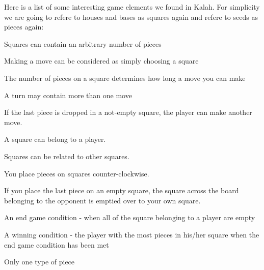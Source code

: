 Here is a list of some interesting game elements we found in Kalah. For simplicity we are going to refere to houses and bases as squares again and refere to seeds as pieces again:

\begin{dlist}
	\item Squares can contain an arbitrary number of pieces
	\item Making a move can be considered as simply choosing a square
	\item The number of pieces on a square determines how long a move you can make
	\item A turn may contain more than one move
		\begin{dlist}
			\item If the last piece is dropped in a not-empty square, the player can make another move.
		\end{dlist}
	\item A square can belong to a player.
	\item Squares can be related to other squares.
		\begin{dlist}
			\item You place pieces on squares counter-clockwise.
			\item If you place the last piece on an empty square, the square across the board belonging to the opponent is emptied over to your own square.
		\end{dlist}
	\item An end game condition - when all of the square belonging to a player are empty
	\item A winning condition - the player with the most pieces in his/her square when the end game condition has been met
	\item Only one type of piece
\end{dlist}


